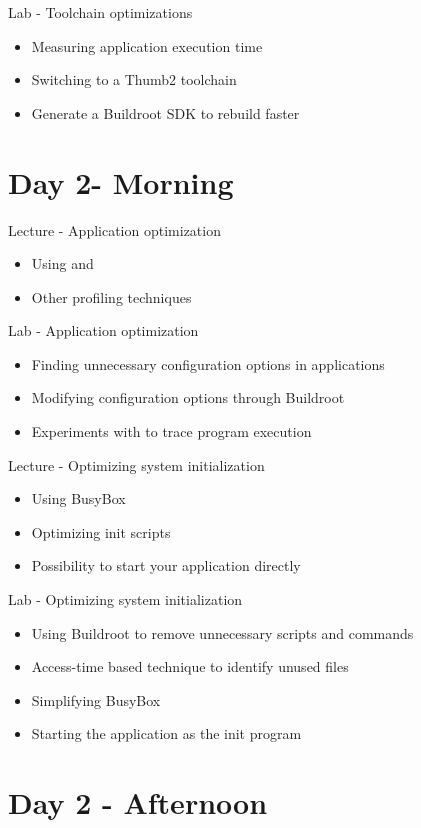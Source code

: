 \documentclass[a4paper,12pt,obeyspaces,spaces,hyphens]{article}
\begin{document}
\feagendaonecolumn
{Lab - Toolchain optimizations}
{
  \begin{itemize}
  \item Measuring application execution time
  \item Switching to a Thumb2 toolchain
  \item Generate a Buildroot SDK to rebuild faster
  \end{itemize}
}

\section{Day 2- Morning}

\feagendatwocolumn
{Lecture - Application optimization}
{
  \begin{itemize}
  \item Using  and 
  \item Other profiling techniques
  \end{itemize}
}
{Lab - Application optimization}
{
 \begin{itemize}
 \item Finding unnecessary configuration options in applications
 \item Modifying configuration options through Buildroot
 \item Experiments with  to trace program execution
 \end{itemize}
}

\feagendatwocolumn
{Lecture - Optimizing system initialization}
{
  \begin{itemize}
  \item Using BusyBox 
  \item Optimizing init scripts
  \item Possibility to start your application directly
  \end{itemize}
}
{Lab - Optimizing system initialization}
{
 \begin{itemize}
 \item Using Buildroot to remove unnecessary scripts and commands
 \item Access-time based technique to identify  unused files
 \item Simplifying BusyBox
 \item Starting the application as the init program
 \end{itemize}
}

\section{Day 2 - Afternoon}
\end{document}
